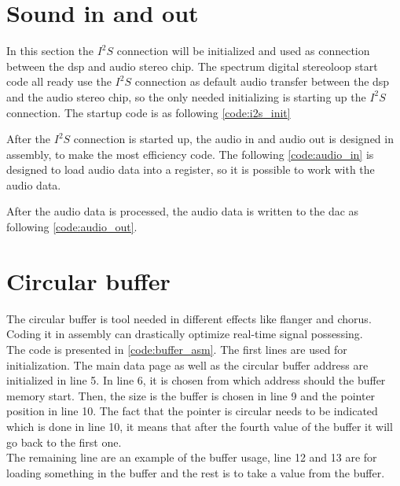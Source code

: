\section{Sound in and out}
In this section the $I^2S$ connection will be initialized and used as connection between the \gls{dsp} and audio stereo chip. The spectrum digital stereoloop start code all ready use the $I^2S$ connection as default audio transfer between the \gls{dsp} and the audio stereo chip, so the only needed initializing is starting up the $I^2S$ connection. The startup code is as following \autoref{code:i2s_init}

After the $I^2S$ connection is started up, the audio in and audio out is designed in assembly, to make the most efficiency code. The following \autoref{code:audio_in} is designed to load audio data into a register, so it is possible to work with the audio data. 

After the audio data is processed, the audio data is written to the \gls{dac} as following \autoref{code:audio_out}.

\section{Circular buffer}

The circular buffer is tool needed in different effects like flanger and chorus. Coding it in assembly can drastically optimize real-time signal possessing. \\

The code is presented in \autoref{code:buffer_asm}. The first lines are used for initialization. The main data page as well as the circular buffer address are initialized in line 5. In line 6, it is chosen from which address should the buffer memory start. Then, the size is the buffer is chosen in line 9 and the pointer position in line 10. The fact that the pointer is circular needs to be indicated which is done in line 10, it means that after the fourth value of the buffer it will go back to the first one.\\

The remaining line are an example of the buffer usage, line 12 and 13 are for loading something in the buffer and the rest is to take a value from the buffer. 





